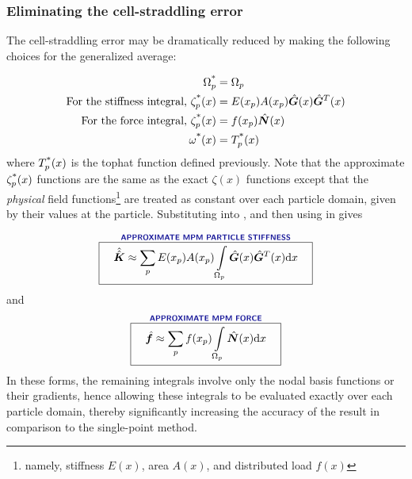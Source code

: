 \subsubsection{Eliminating the cell-straddling error}
The cell-straddling error may be dramatically reduced by making the following choices for the generalized average:

\begin{subequations}
\begin{align}
  \Omega_p^{\text{*}} &= \Omega_p
\\
 \text{For the stiffness integral, }  \zeta_p^{\text{*}}(x)&=E(x_p)A(x_p)\hat{\bm{G}}(x)\hat{\bm{G}}^T(x)
\\
 \text{For the force integral, }  \zeta_p^{\text{*}}(x)&=f(x_p)\hat{\bm{N}}(x)
\\
  \omega^{\text{*}}(x) &=T_p^{\text{*}}(x)
\end{align}
\label{eq:GIMPChoices}
\end{subequations}
where $T_p^{\text{*}}(x)$ is the tophat function defined previously.  Note that the approximate $\zeta_p^{\text{*}}(x)$ functions are the same as the exact $\zeta(x)$ functions except that the \textit{physical} field functions\footnote{namely, stiffness $E(x)$, area $A(x)$, and distributed load $f(x)$} are treated as constant over each particle domain, given by their values at the particle. Substituting  into , and then using  in  gives


\begin{equation}
\overset{\text{\Defn{APPROXIMATE MPM PARTICLE STIFFNESS}}}{\boxit{\quad
  \AArray{K}
\approx
  \sum\limits_p E(x_p)A(x_p)\int\limits_{\Omega_p} \gradNBFa(x)\gradNBFa^T(x) \dd x
\quad}}
\label{eq:LinearBarStiffnessIntegral}
\end{equation}
and
\begin{equation}
\overset{\text{\Defn{APPROXIMATE MPM FORCE}}}{\boxit{\quad
  \Array{f}
\approx
  \sum\limits_p f(x_p)\int\limits_{\Omega_p} \NBFa(x) \dd x
\quad}}
\label{eq:LinearBarForceIntegral}
\end{equation}
In these forms, the remaining integrals involve only the nodal basis functions or their gradients, hence allowing these integrals to be evaluated exactly over each particle domain, thereby significantly increasing the accuracy of the result in comparison to the single-point method.

